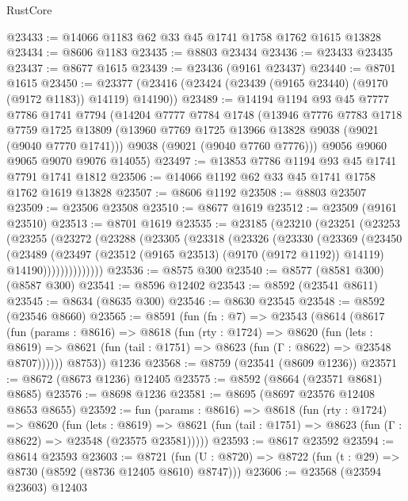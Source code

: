 \begin{lexlean}{RustCore}
\begin{coremodule}
@23433 := @14066 @1183 @62 @33 @45 @1741 @1758 @1762 @1615 @13828
@23434 := @8606 @1183
@23435 := @8803 @23434
@23436 := @23433 @23435
@23437 := @8677 @1615
@23439 := @23436 (@9161 @23437)
@23440 := @8701 @1615
@23450 := @23377 (@23416 (@23424 (@23439 (@9165 @23440) (@9170 (@9172 @1183)) @14119) @14190))
@23489 := @14194
    @1194
    @93
    @45
    @7777
    @7786
    @1741
    @7794
    (@14204
      @7777
      @7784
      @1748
      (@13946
        @7776
        @7783
        @1718
        @7759
        @1725
        @13809
        (@13960 @7769 @1725 @13966 @13828 @9038 (@9021 (@9040 @7770 @1741)))
        @9038
        (@9021 (@9040 @7760 @7776)))
      @9056
      @9060
      @9065
      @9070
      @9076
      @14055)
@23497 := @13853 @7786 @1194 @93 @45 @1741 @7791 @1741 @1812
@23506 := @14066 @1192 @62 @33 @45 @1741 @1758 @1762 @1619 @13828
@23507 := @8606 @1192
@23508 := @8803 @23507
@23509 := @23506 @23508
@23510 := @8677 @1619
@23512 := @23509 (@9161 @23510)
@23513 := @8701 @1619
@23535 := @23185
    (@23210
      (@23251
        (@23253
          (@23255
            (@23272
              (@23288
                (@23305
                  (@23318
                    (@23326
                      (@23330
                        (@23369
                          (@23450
                            (@23489
                              (@23497
                                (@23512 (@9165 @23513) (@9170 (@9172 @1192)) @14119)
                                @14190))))))))))))))
@23536 := @8575 @300
@23540 := @8577 (@8581 @300) (@8587 @300)
@23541 := @8596 @12402
@23543 := @8592 (@23541 @8611)
@23545 := @8634 (@8635 @300)
@23546 := @8630 @23545
@23548 := @8592 (@23546 @8660)
@23565 := @8591
    (fun (fn : @7) =>
    @23543
      (@8614
        (@8617
          (fun (params : @8616) =>
          @8618
            (fun (rty : @1724) =>
            @8620
              (fun (lets : @8619) =>
              @8621 (fun (tail : @1751) => @8623 (fun (Γ : @8622) => @23548 @8707))))))
        @8753))
    @1236
@23568 := @8759 (@23541 (@8609 @1236))
@23571 := @8672 (@8673 @1236) @12405
@23575 := @8592 (@8664 (@23571 @8681) @8685)
@23576 := @8698 @1236
@23581 := @8695 (@8697 @23576 @12408 @8653 @8655)
@23592 := fun (params : @8616) =>
  @8618
    (fun (rty : @1724) =>
    @8620
      (fun (lets : @8619) =>
      @8621 (fun (tail : @1751) => @8623 (fun (Γ : @8622) => @23548 (@23575 @23581)))))
@23593 := @8617 @23592
@23594 := @8614 @23593
@23603 := @8721
    (fun (U : @8720) => @8722 (fun (t : @29) => @8730 (@8592 (@8736 @12405 @8610) @8747)))
@23606 := @23568 (@23594 @23603) @12403

\end{coremodule}
\end{lexlean}
